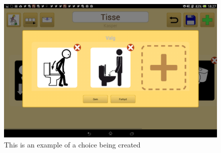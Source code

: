 \begin{figure} [ht!]
\centering
\includegraphics[width=.9\textwidth]{Pics/Sprint3/choices/choiceDialog}
\caption{This is an example of a choice being created}
\label{fig:choiceDialog}
\end{figure}
